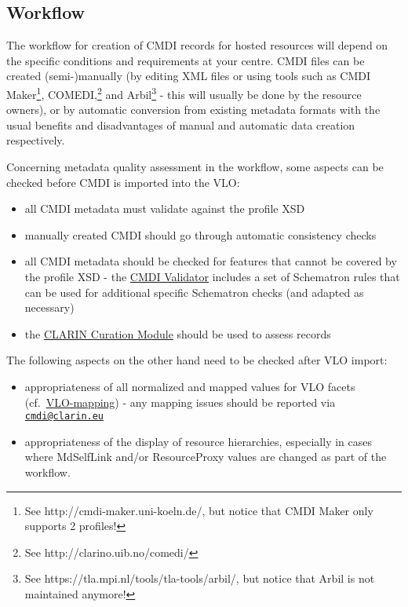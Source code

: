 \subsection{Workflow}\label{authoring-workflow}

The workflow for creation of CMDI records for hosted resources will depend on the specific conditions and requirements at your centre. CMDI files can be created (semi-)manually (by editing XML files or using tools such as CMDI Maker\footnote{See http://cmdi-maker.uni-koeln.de/, but notice that CMDI Maker only supports 2 profiles!}, COMEDI,\footnote{See http://clarino.uib.no/comedi/} and Arbil\footnote{See
https://tla.mpi.nl/tools/tla-tools/arbil/, but notice that Arbil is not maintained anymore!} - this will usually be done by the resource owners), or by automatic conversion from existing metadata formats with the usual benefits and disadvantages of manual and automatic data creation respectively.

Concerning metadata quality assessment in the workflow, some aspects can be checked before CMDI is imported into the VLO:

\begin{itemize}
\tightlist
\item
  all CMDI metadata must validate against the profile XSD
\item
  manually created CMDI should go through automatic consistency checks
\item
  all CMDI metadata should be checked for features that cannot be   covered by the profile XSD - the
  \href{https://github.com/clarin-eric/cmdi-instance-validator/releases/latest}{CMDI Validator} includes a set of Schematron rules that can be used for   additional specific Schematron checks (and adapted as necessary)
\item
  the \href{https://clarin.oeaw.ac.at/curate/}{CLARIN Curation Module}   should be used to assess records
\end{itemize}

The following aspects on the other hand need to be checked after VLO import:

\begin{itemize}
\tightlist
\item
  appropriateness of all normalized and mapped values for VLO facets (cf.~\href{https://github.com/clarin-eric/VLO-mapping}{VLO-mapping}) - any mapping issues should be reported via \href{mailto:cmdi@clarin.eu}{\nolinkurl{cmdi@clarin.eu}}
\item
  appropriateness of the display of resource hierarchies, especially in cases where MdSelfLink and/or ResourceProxy values are changed as part of the workflow.
\end{itemize}
